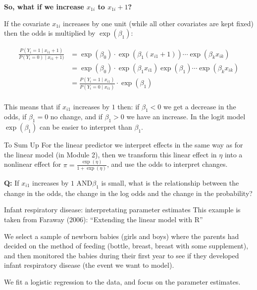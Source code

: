 \documentclass[
  ignorenonframetext,
]{beamer}
\begin{document}
\begin{frame}
\textbf{So, what if we increase \(x_{1i}\) to \(x_{1i}+1\)?}

If the covariate \(x_{1i}\) increases by one unit (while all other
covariates are kept fixed) then the odds is multiplied by
\(\exp(\beta_1)\):

\begin{align*}
\frac{P(Y_i=1\mid x_{i1}+1)}{P(Y_i=0)\mid x_{i1}+1)}&=\exp(\beta_0)\cdot \exp(\beta_1 (x_{i1}+1))\cdots\exp(\beta_k x_{ik})\\
&=\exp(\beta_0)\cdot \exp(\beta_1 x_{i1})\exp(\beta_1)\cdots\exp(\beta_k x_{ik})\\
&=\frac{P(Y_i=1\mid x_{i1})}{P(Y_i=0\mid x_{i1})}\cdot \exp(\beta_1)\\
\end{align*}

This means that if \(x_{i1}\) increases by \(1\) then: if \(\beta_1<0\)
we get a decrease in the odds, if \(\beta_1=0\) no change, and if
\(\beta_1>0\) we have an increase. In the logit model \(\exp(\beta_1)\)
can be easier to interpret than \(\beta_1\).
\end{frame}

\begin{frame}
\begin{block}{To Sum Up}
\label{to-sum-up}
For the linear predictor we interpret effects in the same way as for the
linear model (in Module 2), then we transform this linear effect in
\(\eta\) into a nonlinear effect for
\(\pi=\frac{\exp(\eta)}{1+\exp(\eta)}\), and use the odds to interpret
changes.

\textbf{Q:} If \(x_{i1}\) increases by \(1\) AND\(\beta_1\) is small,
what is the relationship between the change in the odds, the change in
the log odds and the change in the probability?
\end{block}
\end{frame}

\begin{frame}
\begin{block}{Infant respiratory disease: interpretating parameter
estimates}
\label{infant-respiratory-disease-interpretating-parameter-estimates}
This example is taken from Faraway (2006): ``Extending the linear model
with R''

We select a sample of newborn babies (girls and boys) where the parents
had decided on the method of feeding (bottle, breast, breast with some
supplement), and then monitored the babies during their first year to
see if they developed infant respiratory disease (the event we want to
model).

We fit a logistic regression to the data, and focus on the parameter
estimates.
\end{block}
\end{frame}
\end{document}
